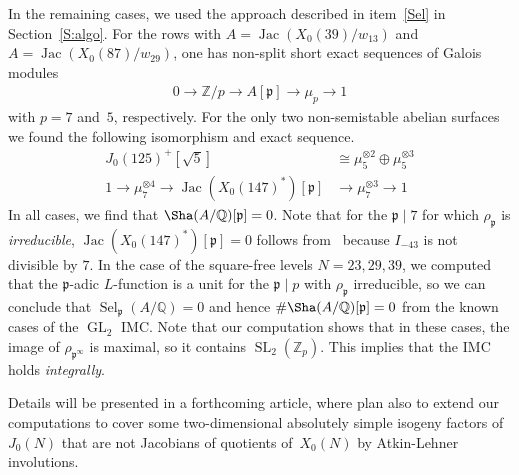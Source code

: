 \documentclass{amsart}
\newcommand{\Q}{{\mathbb{Q}}}
\newcommand{\Z}{{\mathbb{Z}}}
\newcommand{\pfr}{{\mathfrak{p}}}
\newcommand{\Jac}{\operatorname{Jac}}
\newcommand{\GL}{\operatorname{GL}}
\newcommand{\SL}{\operatorname{SL}}
\newcommand{\Sel}{\operatorname{Sel}}
\newcommand{\isom}{\cong}
\begin{document}
	In the remaining cases, we used the approach described in item~\eqref{Sel}
	in Section~\ref{S:algo}.
	For the rows with $A = \Jac(X_0(39)/w_{13})$ and $A = \Jac(X_0(87)/w_{29})$,
	one has non-split short exact sequences of Galois modules
	\begin{align*}
		0 \to \Z/p \to A[\pfr] \to \mu_p \to 1
	\end{align*}
	with $p = 7$ and~$5$, respectively. For the only two non-semistable abelian surfaces
	we found the following isomorphism and exact sequence.
	\begin{align*}
		J_0(125)^+[\sqrt{5}] &\isom \mu_5^{\otimes 2} \oplus \mu_5^{\otimes 3} \\
		1 \to \mu_7^{\otimes 4} \to \Jac(X_0(147)^*)[\pfr] &\to \mu_7^{\otimes 3} \to 1
	\end{align*}
	In all cases, we find that $\Sha(A/\Q)[\pfr] = 0$.
	Note that for the $\pfr \mid 7$ for which $\rho_\pfr$ is \emph{irreducible},
	$\Jac(X_0(147)^*)[\pfr] = 0$ follows from~\cite{KolyvaginLogachev}
	because $I_{-43}$ is not divisible by $7$. In the case of the square-free levels $N = 23, 29, 39$, we computed that the $\pfr$-adic $L$-function is a unit for the $\pfr \mid p$ with $\rho_\pfr$ irreducible, so we can conclude that $\Sel_\pfr(A/\Q) = 0$ and hence $\#\Sha(A/\Q)[\pfr] = 0$ from the known cases of the $\GL_2$ IMC. Note that our computation shows that in these cases, the image of $\rho_{\pfr^\infty}$ is maximal, so it contains $\SL_2(\Z_p)$. This implies that the IMC holds \emph{integrally}.
	
	Details will be presented in a forthcoming article, where plan also to extend
	our computations to cover some two-dimensional absolutely simple isogeny
	factors of~$J_0(N)$ that are not Jacobians of quotients of~$X_0(N)$ by
	Atkin-Lehner involutions.
	
	
	
\end{document}
